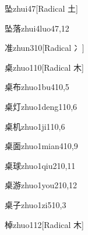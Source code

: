 \begin{verbete}{坠}{zhui4}{7}[Radical 土]
\end{verbete}

\begin{verbete}{坠落}{zhui4luo4}{7,12}
\end{verbete}

\begin{verbete}{准}{zhun3}{10}[Radical 冫]
\end{verbete}

\begin{verbete}{桌}{zhuo1}{10}[Radical 木]
\end{verbete}

\begin{verbete}{桌布}{zhuo1bu4}{10,5}
\end{verbete}

\begin{verbete}{桌灯}{zhuo1deng1}{10,6}
\end{verbete}

\begin{verbete}{桌机}{zhuo1ji1}{10,6}
\end{verbete}

\begin{verbete}{桌面}{zhuo1mian4}{10,9}
\end{verbete}

\begin{verbete}{桌球}{zhuo1qiu2}{10,11}
\end{verbete}

\begin{verbete}{桌游}{zhuo1you2}{10,12}
\end{verbete}

\begin{verbete}{桌子}{zhuo1zi5}{10,3}
\end{verbete}

\begin{verbete}{棹}{zhuo1}{12}[Radical 木]
\end{verbete}

